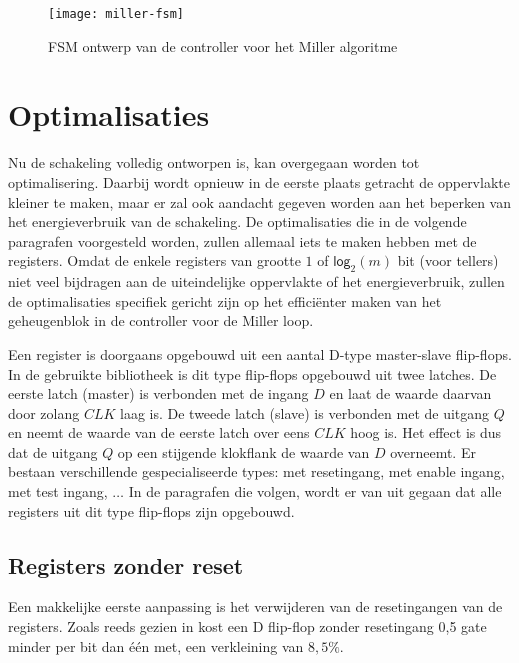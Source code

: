 \begin{figure}[h]
	\centering
		\texttt{[image: miller-fsm]}
		\caption{FSM ontwerp van de controller voor het Miller algoritme\label{figuur-miller-fsm}}
\end{figure}

\section{Optimalisaties\label{sectie-implementatie-optimalisaties}}

Nu de schakeling volledig ontworpen is, kan overgegaan worden tot optimalisering. Daarbij wordt opnieuw in de eerste plaats getracht de oppervlakte kleiner te maken, maar er zal ook aandacht gegeven worden aan het beperken van het energieverbruik van de schakeling. De optimalisaties die in de volgende paragrafen voorgesteld worden, zullen allemaal iets te maken hebben met de registers. Omdat de enkele registers van grootte $1$ of $\textsf{log}_2(m)$ bit (voor tellers) niet veel bijdragen aan de uiteindelijke oppervlakte of het energieverbruik, zullen de optimalisaties specifiek gericht zijn op het effici\"enter maken van het geheugenblok in de controller voor de Miller loop.

Een register is doorgaans opgebouwd uit een aantal D-type master-slave flip-flops. In de gebruikte bibliotheek \cite{cell-databook} is dit type flip-flops opgebouwd uit twee latches. De eerste latch (master) is verbonden met de ingang $D$ en laat de waarde daarvan door zolang $CLK$ laag is. De tweede latch (slave) is verbonden met de uitgang $Q$  en neemt de waarde van de eerste latch over eens $CLK$ hoog is. Het effect is dus dat de uitgang $Q$ op een stijgende klokflank de waarde van $D$ overneemt. Er bestaan verschillende gespecialiseerde types: met resetingang, met enable ingang, met test ingang, $\ldots$ In de paragrafen die volgen, wordt er van uit gegaan dat alle registers uit dit type flip-flops zijn opgebouwd.

\subsection{Registers zonder reset}

Een makkelijke eerste aanpassing is het verwijderen van de resetingangen van de registers. Zoals reeds gezien in  kost een D flip-flop zonder resetingang 0,5 gate minder per bit dan \'e\'en met, een verkleining van $8,5\%$.

